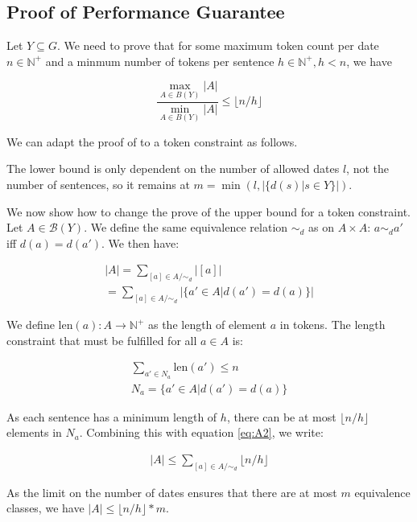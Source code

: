 \documentclass[a4paper,BCOR=10mm]{report}
\begin{document}
\begin{appendices}
\chapter{Proof of Performance Guarantee}

Let $Y \subseteq G$. We need to prove that for some maximum token count per date $n \in \mathbb{N}^+$ and a minmum number of tokens per sentence $h \in \mathbb{N}^+, h < n$, we have

\begin{displaymath}
\frac{\max_{A \in B(Y)} |A|}{\min_{A \in B(Y)} |A|} \leq \lfloor n/h \rfloor
\end{displaymath}

We can adapt the proof of \citet{markert} to a token constraint as follows.

The lower bound is only dependent on the number of allowed dates $l$, not the number of sentences, so it remains at $m = \min(l, |\{d(s) | s \in Y \}|)$.

We now show how to change the prove of the upper bound for a token constraint.
Let $A \in \mathcal{B}(Y)$.
We define the same equivalence relation $\sim_d$ as \citeauthor{markert} on $A \times A$:
$a \sim_d a'$ iff $d(a) = d(a')$.
We then have:

\begin{align}
|A| = \sum_{[a] \in A/\sim_d} |[a]| \\
    = \sum_{[a] \in A/\sim_d} |\{ a' \in A | d(a') = d(a) \}| \label{eq:A2}
\end{align}

We define $\text{len}(a) : A \rightarrow \mathbb{N}^+$ as the length of element $a$ in tokens.
The length constraint that must be fulfilled for all $a \in A$ is:

\begin{align*}
\sum_{a' \in N_a} \text{len}(a') \leq n \\
N_a = \{ a' \in A | d(a') = d(a) \}
\end{align*}

As each sentence has a minimum length of $h$, there can be at most $\lfloor n / h \rfloor $ elements in $N_a$.
Combining this with equation \ref{eq:A2}, we write:

\begin{align*}
|A| \leq \sum_{[a] \in A/\sim_d} \lfloor n/h \rfloor
\end{align*}

As the limit on the number of dates ensures that there are at most $m$ equivalence classes, we have $|A| \leq \lfloor n/h \rfloor * m$.


\end{appendices}
\end{document}
